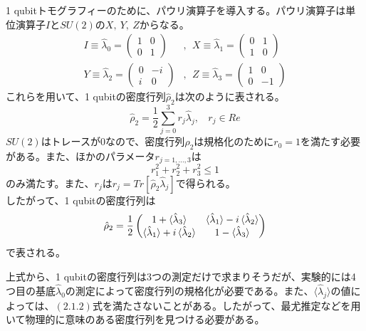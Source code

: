 \documentclass[11pt,a4j,notitlepage]{jreport}
\begin{document}
	1 qubitトモグラフィーのために、パウリ演算子を導入する。パウリ演算子は単位演算子$I$と$SU(2)$の$X,\ Y,\ Z$からなる。
	\begin{equation}
		\begin{aligned}
			I \equiv \hat{\lambda}_0 = \begin{pmatrix} 1 & 0 \\ 0 & 1 \end{pmatrix}&,\ \ X \equiv \hat{\lambda}_1 = \begin{pmatrix} 0 & 1 \\ 1 & 0 \end{pmatrix}\\
			Y \equiv \hat{\lambda}_2 = \begin{pmatrix} 0 & -i \\ i & 0 \end{pmatrix}&,\ \ Z \equiv \hat{\lambda}_3 = \begin{pmatrix} 1 & 0 \\ 0 & -1 \end{pmatrix}
		\end{aligned}
		\label{eq2.3}
	\end{equation}
	これらを用いて、1 qubitの密度行列$\hat{\rho}_2$は次のように表される。
	\begin{equation}
		\hat{\rho}_2 = \frac{1}{2} \sum_{j=0}^3 r_j \hat{\lambda}_j, \ \ \ \ r_j \in Re
		\label{eq2.4}
	\end{equation}
	$SU(2)$はトレースが0なので、密度行列$\hat{\rho}_2$は規格化のために$r_0 = 1$を満たす必要がある。また、ほかのパラメータ$r_{j=1,...,3}$は
	\begin{equation}
		r_1^2 + r_2^2 + r_3^2 \leq 1
		\label{eq2.5}
	\end{equation}
	のみ満たす。また、$r_j$は$r_j = Tr[\hat{\rho}_2 \hat{\lambda}_j]$で得られる。\\
	
	したがって、1 qubitの密度行列は
	\begin{equation}
		\hat{\rho}_2 = \frac{1}{2} \begin{pmatrix}
			1 + \braket{\hat{\lambda}_3} &
			\braket{\hat{\lambda}_1} - i \braket{\hat{\lambda}_2} \\
			\braket{\hat{\lambda}_1} + i \braket{\hat{\lambda}_2} &
			1 - \braket{\hat{\lambda}_3}
			\end{pmatrix}
	\end{equation}
	で表される。
	
	上式から、1 qubitの密度行列は3つの測定だけで求まりそうだが、実験的には4つ目の基底$\hat{\lambda}_0$の測定によって密度行列の規格化が必要である。また、$\langle \hat{\lambda}_j \rangle$の値によっては、$(2.1.2)$式を満たさないことがある。したがって、最尤推定などを用いて物理的に意味のある密度行列を見つける必要がある。
\end{document}
